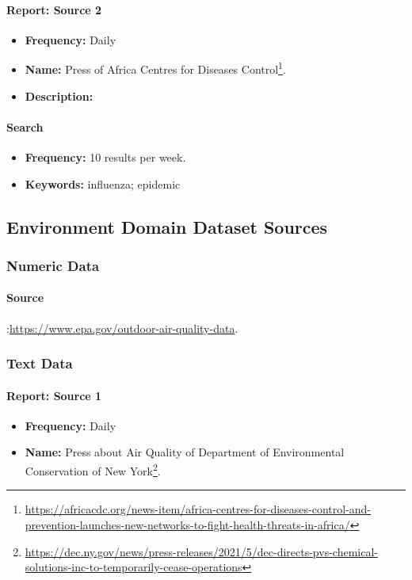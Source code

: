 \paragraph{Report: Source 2}
\begin{itemize}
    \item \textbf{Frequency:} Daily
    \item \textbf{Name:} Press of  Africa Centres for Diseases Control\footnote{\url{https://africacdc.org/news-item/africa-centres-for-diseases-control-and-prevention-launches-new-networks-to-fight-health-threats-in-africa/}}.
    \item \textbf{Description:} 
\end{itemize}
\paragraph{Search}
\begin{itemize}
    \item \textbf{Frequency:} 10 results per week.
    \item \textbf{Keywords:} influenza; epidemic
\end{itemize}



\subsection{Environment  Domain Dataset Sources}


\subsubsection{Numeric Data}
\paragraph{Source}:\url{https://www.epa.gov/outdoor-air-quality-data}.

\subsubsection{Text Data}
\paragraph{Report: Source 1}
\begin{itemize}
    \item \textbf{Frequency:} Daily
    \item \textbf{Name:} Press about Air Quality of Department of Environmental Conservation of New York\footnote{\href{https://dec.ny.gov/news/press-releases/2021/5/dec-directs-pvs-chemical-solutions-inc-to-temporarily-cease-operations\%23:~:text=The\%20New\%20York\%20State\%20Department\%20of\%20Environmental\%20Conservation,Medaille\%20College\%20Sports\%20Complex\%20at\%20Buffalo\%20Color\%20Park.}{https://dec.ny.gov/news/press-releases/2021/5/dec-directs-pvs-chemical-solutions-inc-to-temporarily-cease-operations}}.
\end{itemize}
